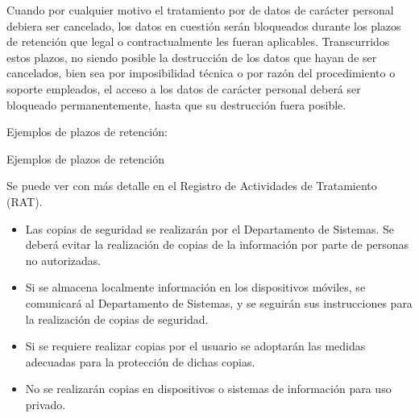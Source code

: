 \begin{enumerate}[label=\alph*)]
    Cuando por cualquier motivo el tratamiento por \Beneficiario{} de datos de carácter personal debiera ser cancelado, los datos en cuestión serán bloqueados durante los plazos de retención que legal o contractualmente les fueran aplicables. Transcurridos estos plazos, no siendo posible la destrucción de los datos que hayan de ser cancelados, bien sea por imposibilidad técnica o por razón del procedimiento o soporte empleados, el acceso a los datos de carácter personal deberá ser bloqueado permanentemente, hasta que su destrucción fuera posible.

    Ejemplos de plazos de retención:

    \begin{table}[H]
        \centering
        \small
        \caption{Ejemplos de plazos de retención}
        \label{tab:guia-sgsi-obligaciones-usuario-plazos-retencion}
        \normalsize
    \end{table}

    Se puede ver con más detalle en el Registro de Actividades de Tratamiento (RAT).

    \begin{itemize}
        \item Las copias de seguridad se realizarán por el Departamento de Sistemas. Se deberá evitar la realización de copias de la información por parte de personas no autorizadas.
        \item Si se almacena localmente información en los dispositivos móviles, se comunicará al Departamento de Sistemas, y se seguirán sus instrucciones para la realización de copias de seguridad.
        \item Si se requiere realizar copias por el usuario se adoptarán las medidas adecuadas para la protección de dichas copias.
        \item No se realizarán copias en dispositivos o sistemas de información para uso privado.
    \end{itemize}

\end{enumerate}
